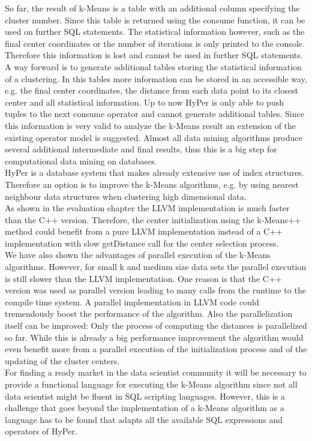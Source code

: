 So far, the result of k-Means is a table with an additional column specifying the cluster number. Since this table is returned using the consume function, it can be used on further SQL statements. The statistical information however, such as the final center coordinates or the number of iterations is only printed to the console. Therefore this information is lost and cannot be used in further SQL statements. A way forward is to generate additional tables storing the statistical information of a clustering. In this tables more information can be stored in an accessible way, e.g. the final center coordinates, the distance from each data point to its closest center and all statistical information. Up to now HyPer is only able to push tuples to the next consume operator and cannot generate additional tables. Since this information is very valid to analyze the k-Means result an extension of the existing operator model is suggested. Almost all data mining algorithms produce several additional intermediate and final results, thus this is a big step for computational data mining on databases.
\\
HyPer is a database system that makes already extensive use of index structures. Therefore an option is to improve the k-Means algorithms, e.g. by using nearest neighbour data structures when clustering high dimensional data.
\\
As shown in the evaluation chapter the LLVM implementation is much faster than the C++ version. Therefore, the center initialization using the k-Means++ method could benefit from a pure LLVM implementation instead of a C++ implementation with slow getDistance call for the center selection process.
\\
We have also shown the advantages of parallel execution of the k-Means algorithms. However, for small k and medium size data sets the parallel execution is still slower than the LLVM implementation. One reason is that the C++ version was used as parallel version leading to many calls from the runtime to the compile time system. A parallel implementation in LLVM code could tremendously boost the performance of the algorithm. Also the parallelization itself can be improved: Only the process of computing the distances is parallelized so far. While this is already a big performance improvement the algorithm would even benefit more from a parallel execution of the initialization process and of the updating of the cluster centers.
\\
For finding a ready market in the data scientist community it will be necessary to provide a functional language for executing the k-Means algorithm since not all data scientist might be fluent in SQL scripting languages. However, this is a challenge that goes beyond the implementation of a k-Means algorithm as a language has to be found that adapts all the available SQL expressions and operators of HyPer.
